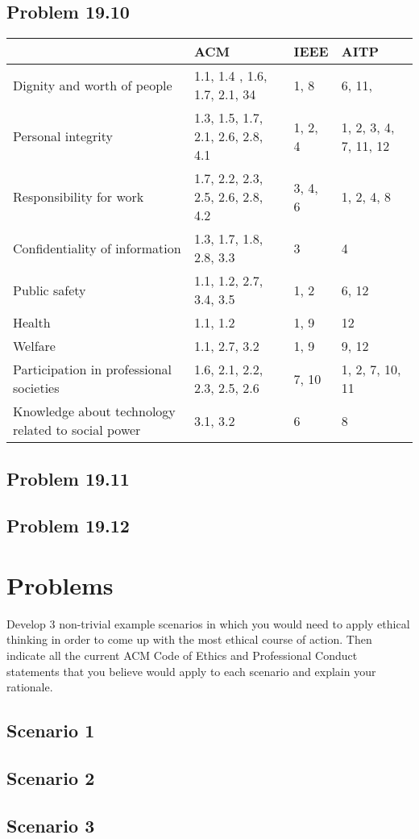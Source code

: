 \documentclass[14pt]{article}
\begin{document}
\subsection{Problem 19.10}
{\renewcommand{\arraystretch}{2}%
  \begin{tabular}{|l|l|l|l|}
    \cline{2-4}
    \multicolumn{1}{r|}{}& ACM & IEEE & AITP \\ \hline
    Dignity and worth of people & 1.1, 1.4 , 1.6, 1.7, 2.1, 34 & 1, 8 & 6, 11, \\ \hline
    Personal integrity & 1.3, 1.5, 1.7, 2.1, 2.6, 2.8, 4.1 & 1, 2, 4 & 1, 2, 3, 4, 7, 11, 12 \\ \hline
    Responsibility for work & 1.7, 2.2, 2.3, 2.5, 2.6, 2.8, 4.2 & 3, 4, 6 & 1, 2, 4, 8 \\ \hline
    Confidentiality of information & 1.3, 1.7, 1.8, 2.8, 3.3 & 3 & 4 \\ \hline
    Public safety & 1.1, 1.2, 2.7, 3.4, 3.5 & 1, 2 & 6, 12 \\ \hline
    Health & 1.1, 1.2 & 1, 9 & 12 \\ \hline
    Welfare & 1.1, 2.7, 3.2 & 1, 9 & 9, 12 \\ \hline
    Participation in professional societies & 1.6, 2.1, 2.2, 2.3, 2.5, 2.6 & 7, 10 & 1, 2, 7, 10, 11 \\ \hline
    Knowledge about technology related to social power & 3.1, 3.2 & 6 & 8 \\ \hline
  \end{tabular}}
\newpage
\subsection{Problem 19.11}

\newpage
\subsection{Problem 19.12}

\newpage

\section{Problems}
Develop 3 non-trivial example scenarios in which you would need to apply ethical thinking in order to come up with the most ethical course of action. Then indicate all the current ACM Code of Ethics and Professional Conduct statements that you believe would apply to each scenario and explain your rationale.
\subsection{Scenario 1}

\newpage
\subsection{Scenario 2}

\newpage
\subsection{Scenario 3}


\newpage


\end{document}
